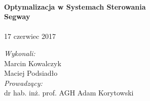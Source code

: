 \begin{titlepage}
\HRule \\[0.4cm]
{ \huge \bfseries Optymalizacja w Systemach Sterowania\\[1cm]Segway}\\[0.4cm] %
\HRule \\[2cm]%
 



{\large 17 czerwiec 2017}\\[1.5cm] %



\begin{flushleft}
\Large
\emph{Wykonali:}\\
Marcin Kowalczyk\\
Maciej Podsiadło\\[1cm]

 \emph{Prowadzący:}\\
dr hab. inż. prof. AGH Adam Korytowski\\[3cm] %
 
\end{flushleft}
\end{titlepage}
\clearpage
\setcounter{page}{2}